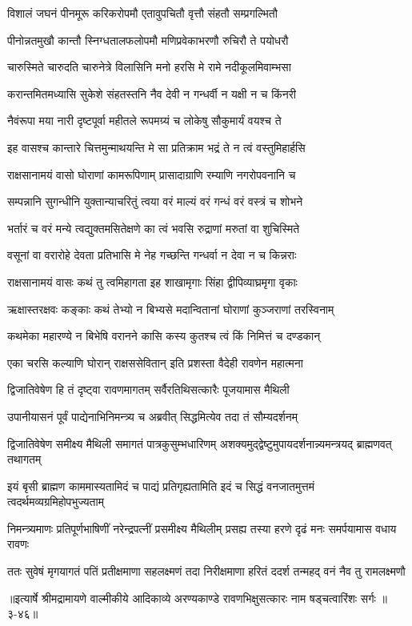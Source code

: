 \twolineshloka
{विशालं जघनं पीनमूरू करिकरोपमौ}
{एतावुपचितौ वृत्तौ संहतौ सम्प्रगल्भितौ} %

\twolineshloka
{पीनोन्नतमुखौ कान्तौ स्निग्धतालफलोपमौ}
{मणिप्रवेकाभरणौ रुचिरौ ते पयोधरौ} %

\twolineshloka
{चारुस्मिते चारुदति चारुनेत्रे विलासिनि}
{मनो हरसि मे रामे नदीकूलमिवाम्भसा} %

\twolineshloka
{करान्तमितमध्यासि सुकेशे संहतस्तनि}
{नैव देवी न गन्धर्वी न यक्षी न च किंनरी} %

\twolineshloka
{नैवंरूपा मया नारी दृष्टपूर्वा महीतले}
{रूपमग्र्यं च लोकेषु सौकुमार्यं वयश्च ते} %

\twolineshloka
{इह वासश्च कान्तारे चित्तमुन्माथयन्ति मे}
{सा प्रतिक्राम भद्रं ते न त्वं वस्तुमिहार्हसि} %

\twolineshloka
{राक्षसानामयं वासो घोराणां कामरूपिणाम्}
{प्रासादाग्राणि रम्याणि नगरोपवनानि च} %

\twolineshloka
{सम्पन्नानि सुगन्धीनि युक्तान्याचरितुं त्वया}
{वरं माल्यं वरं गन्धं वरं वस्त्रं च शोभने} %

\twolineshloka
{भर्तारं च वरं मन्ये त्वद्युक्तमसितेक्षणे}
{का त्वं भवसि रुद्राणां मरुतां वा शुचिस्मिते} %

\twolineshloka
{वसूनां वा वरारोहे देवता प्रतिभासि मे}
{नेह गच्छन्ति गन्धर्वा न देवा न च किन्नराः} %

\twolineshloka
{राक्षसानामयं वासः कथं तु त्वमिहागता}
{इह शाखामृगाः सिंहा द्वीपिव्याघ्रमृगा वृकाः} %

\twolineshloka
{ऋक्षास्तरक्षवः कङ्काः कथं तेभ्यो न बिभ्यसे}
{मदान्वितानां घोराणां कुञ्जराणां तरस्विनाम्} %

\twolineshloka
{कथमेका महारण्ये न बिभेषि वरानने}
{कासि कस्य कुतश्च त्वं किं निमित्तं च दण्डकान्} %

\twolineshloka
{एका चरसि कल्याणि घोरान् राक्षससेवितान्}
{इति प्रशस्ता वैदेही रावणेन महात्मना} %

\twolineshloka
{द्विजातिवेषेण हि तं दृष्ट्वा रावणमागतम्}
{सर्वैरतिथिसत्कारैः पूजयामास मैथिली} %

\twolineshloka
{उपानीयासनं पूर्वं पाद्येनाभिनिमन्त्र्य च}
{अब्रवीत् सिद्धमित्येव तदा तं सौम्यदर्शनम्} %

\twolineshloka
{द्विजातिवेषेण समीक्ष्य मैथिली समागतं पात्रकुसुम्भधारिणम्}
{अशक्यमुद्द्वेष्टुमुपायदर्शनान्न्यमन्त्रयद् ब्राह्मणवत् तथागतम्} %

\twolineshloka
{इयं बृसी ब्राह्मण काममास्यतामिदं च पाद्यं प्रतिगृह्यतामिति}
{इदं च सिद्धं वनजातमुत्तमं त्वदर्थमव्यग्रमिहोपभुज्यताम्} %

\twolineshloka
{निमन्त्र्यमाणः प्रतिपूर्णभाषिणीं नरेन्द्रपत्नीं प्रसमीक्ष्य मैथिलीम्}
{प्रसह्य तस्या हरणे दृढं मनः समर्पयामास वधाय रावणः} %

\twolineshloka
{ततः सुवेषं मृगयागतं पतिं प्रतीक्षमाणा सहलक्ष्मणं तदा}
{निरीक्षमाणा हरितं ददर्श तन्महद् वनं नैव तु रामलक्ष्मणौ} %


॥इत्यार्षे श्रीमद्रामायणे वाल्मीकीये आदिकाव्ये अरण्यकाण्डे रावणभिक्षुसत्कारः नाम षड्चत्वारिंशः सर्गः ॥३-४६॥
